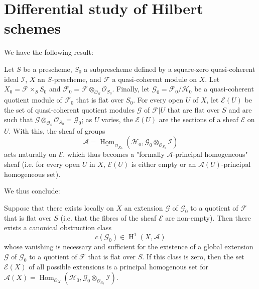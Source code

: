 \section{Differential study of Hilbert schemes}\label{fga3.iv-5}

We have the following result:

\begin{proposition}\label{fga3.iv-5-proposition-5.1}
  Let $S$ be a prescheme, $S_0$ a subprescheme defined by a square-zero quasi-coherent ideal $\mathcal{I}$, $X$ an $S$-prescheme, and $\mathcal{F}$ a quasi-coherent module on $X$.
  Let $X_0=\mathcal{F}\times_S S_0$ and $\mathcal{F}_0=\mathcal{F}\otimes_{\mathcal{O}_S}\mathcal{O}_{S_0}$.
  Finally, let $\mathcal{G}_0=\mathcal{F}_0/\mathcal{H}_0$ be a quasi-coherent quotient module of $\mathcal{F}_0$ that is flat over $S_0$.
  For every open $U$ of $X$, let $\mathcal{E}(U)$ be the set of quasi-coherent quotient modules $\mathcal{G}$ of $\mathcal{F}|U$ that are flat over $S$ and are such that $\mathcal{G}\otimes_{\mathcal{O}_S}\mathcal{O}_{S_0}=\mathcal{G}_0$;
  as $U$ varies, the $\mathcal{E}(U)$ are the sections of a sheaf $\mathcal{E}$ on $U$.
  With this, the sheaf of groups
  \[
    \mathcal{A}
    = \underline{\operatorname{Hom}}_{\mathcal{O}_{X_0}}(\mathcal{H}_0,\mathcal{G}_0\otimes_{\mathcal{O}_{S_0}}\mathcal{I})
  \]
  acts naturally on $\mathcal{E}$, which thus becomes a "formally $\mathscr{A}$-principal homogeneous" sheaf (i.e. for every open $U$ in $X$, $\mathcal{E}(U)$ is either empty or an $\mathcal{A}(U)$-principal homogeneous set).
\end{proposition}

We thus conclude:


\begin{corollary}\label{fga3.iv-5-corollary-5.2}
  Suppose that there exists locally on $X$ an extension $\mathcal{G}$ of $\mathcal{G}_0$ to a quotient of $\mathcal{F}$ that is flat over $S$ (i.e. that the fibres of the sheaf $\mathcal{E}$ are non-empty).
  Then there exists a canonical obstruction class
  \[
    c(\mathcal{G}_0) \in \operatorname{H}^1(X,\mathcal{A})
  \]
  whose vanishing is necessary and sufficient for the existence of a global extension $\mathcal{G}$ of $\mathcal{G}_0$ to a quotient of $\mathcal{F}$ that is flat over $S$.
  If this class is zero, then the set $\mathcal{E}(X)$ of all possible extensions is a principal homogenous set for $\mathcal{A}(X)=\operatorname{Hom}_{\mathcal{O}_X}(\mathcal{H}_0,\mathcal{G}_0\otimes_{\mathcal{O}_{S_0}}\mathcal{I})$.
\end{corollary}


